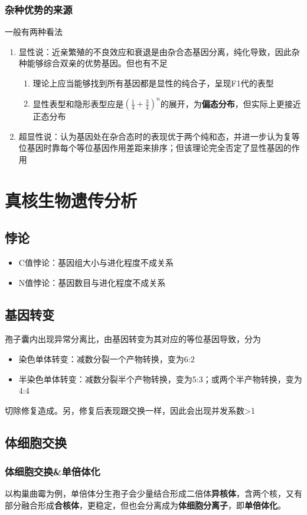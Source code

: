 \documentclass[a4paper, 12pt]{report}
\begin{document}
  \subsection{杂种优势的来源}
  一般有两种看法
  \begin{enumerate}
    \item 显性说：近亲繁殖的不良效应和衰退是由杂合态基因分离，纯化导致，因此杂种能够综合双亲的优势基因。但也有不足
    \begin{enumerate}
      \item 理论上应当能够找到所有基因都是显性的纯合子，呈现F1代的表型
      \item 显性表型和隐形表型应是\((\frac{1}{4}+\frac{3}{4})^n\)的展开，为\textbf{偏态分布}，但实际上更接近正态分布
    \end{enumerate}
    \item 超显性说：认为基因处在杂合态时的表现优于两个纯和态，并进一步认为复等位基因时靠每个等位基因作用差距来排序；但该理论完全否定了显性基因的作用
  \end{enumerate}
  \chapter{真核生物遗传分析}
  \section{悖论}
  \begin{itemize}
    \item C值悖论：基因组大小与进化程度不成关系
    \item N值悖论：基因数目与进化程度不成关系
  \end{itemize}
  \section{基因转变}
  孢子囊内出现异常分离比，由基因转变为其对应的等位基因导致，分为
  \begin{itemize}
    \item 染色单体转变：减数分裂一个产物转换，变为6:2
    \item 半染色单体转变：减数分裂半个产物转换，变为5:3；或两个半产物转换，变为4:4
  \end{itemize}
  切除修复造成。另，修复后表现跟交换一样，因此会出现并发系数>1
  \section{体细胞交换}
  \subsection{体细胞交换\&单倍体化}
  以构巢曲霉为例，单倍体分生孢子会少量结合形成二倍体\textbf{异核体}，含两个核，又有部分融合形成\textbf{合核体}，更稳定，但也会分离成为\textbf{体细胞分离子}，即\textbf{单倍体化}。
\end{document}
